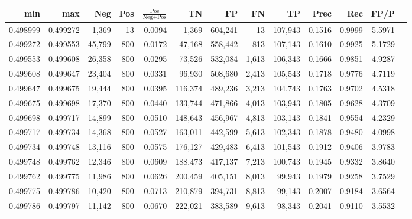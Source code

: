 \begin{tabular}{rrrrrrrrrrrrr}
\toprule
     min &      max &    Neg &   Pos & $\frac{\text{Pos}}{\text{Neg}+\text{Pos}}$ &      TN &      FP &      FN &      TP &   Prec &    Rec &   FP/P \\
\midrule
0.498999 & 0.499272 &  1,369 &    13 &                                     0.0094 &   1,369 & 604,241 &      13 & 107,943 & 0.1516 & 0.9999 & 5.5971 \\
0.499272 & 0.499553 & 45,799 &   800 &                                     0.0172 &  47,168 & 558,442 &     813 & 107,143 & 0.1610 & 0.9925 & 5.1729 \\
0.499553 & 0.499608 & 26,358 &   800 &                                     0.0295 &  73,526 & 532,084 &   1,613 & 106,343 & 0.1666 & 0.9851 & 4.9287 \\
0.499608 & 0.499647 & 23,404 &   800 &                                     0.0331 &  96,930 & 508,680 &   2,413 & 105,543 & 0.1718 & 0.9776 & 4.7119 \\
0.499647 & 0.499675 & 19,444 &   800 &                                     0.0395 & 116,374 & 489,236 &   3,213 & 104,743 & 0.1763 & 0.9702 & 4.5318 \\
0.499675 & 0.499698 & 17,370 &   800 &                                     0.0440 & 133,744 & 471,866 &   4,013 & 103,943 & 0.1805 & 0.9628 & 4.3709 \\
0.499698 & 0.499717 & 14,899 &   800 &                                     0.0510 & 148,643 & 456,967 &   4,813 & 103,143 & 0.1841 & 0.9554 & 4.2329 \\
0.499717 & 0.499734 & 14,368 &   800 &                                     0.0527 & 163,011 & 442,599 &   5,613 & 102,343 & 0.1878 & 0.9480 & 4.0998 \\
0.499734 & 0.499748 & 13,116 &   800 &                                     0.0575 & 176,127 & 429,483 &   6,413 & 101,543 & 0.1912 & 0.9406 & 3.9783 \\
0.499748 & 0.499762 & 12,346 &   800 &                                     0.0609 & 188,473 & 417,137 &   7,213 & 100,743 & 0.1945 & 0.9332 & 3.8640 \\
0.499762 & 0.499775 & 11,986 &   800 &                                     0.0626 & 200,459 & 405,151 &   8,013 &  99,943 & 0.1979 & 0.9258 & 3.7529 \\
0.499775 & 0.499786 & 10,420 &   800 &                                     0.0713 & 210,879 & 394,731 &   8,813 &  99,143 & 0.2007 & 0.9184 & 3.6564 \\
0.499786 & 0.499797 & 11,142 &   800 &                                     0.0670 & 222,021 & 383,589 &   9,613 &  98,343 & 0.2041 & 0.9110 & 3.5532 \\

\end{tabular}
